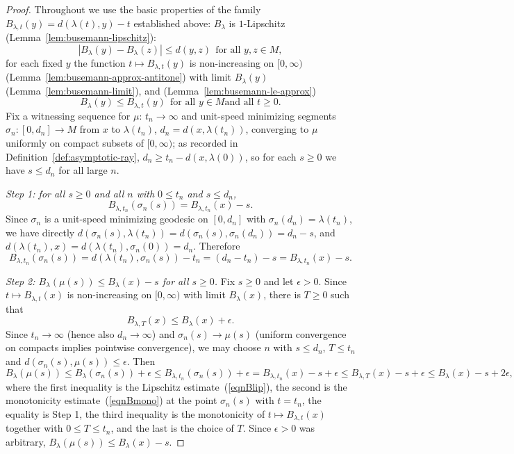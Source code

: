 \begin{proof}
\leanok
{}
Throughout we use the basic properties of the family
$B_{\lambda,t}(y)=d(\lambda(t),y)-t$ established above: $B_\lambda$
is $1$-Lipschitz (Lemma~\ref{lem:busemann-lipschitz}):
\begin{equation}\label{eqnBlip}
|B_\lambda(y)-B_\lambda(z)|\le d(y,z)\ \ \text{for all } y,z\in M,
\end{equation}
for each fixed $y$ the function $t\mapsto B_{\lambda,t}(y)$ is
non-increasing on $[0,\infty)$
(Lemma~\ref{lem:busemann-approx-antitone}) with limit
$B_\lambda(y)$ (Lemma~\ref{lem:busemann-limit}), and
(Lemma~\ref{lem:busemann-le-approx})
\begin{equation}\label{eqnBmono}
B_\lambda(y)\le B_{\lambda,t}(y)\ \ \text{for all } y\in M \text{
and all } t\ge 0.
\end{equation}
Fix a witnessing sequence for $\mu$: $t_n\rightarrow\infty$ and
unit-speed minimizing segments $\sigma_n\colon[0,d_n]\to M$ from
$x$ to $\lambda(t_n)$, $d_n=d(x,\lambda(t_n))$, converging to $\mu$
uniformly on compact subsets of $[0,\infty)$; as recorded in
Definition~\ref{def:asymptotic-ray}, $d_n\ge
t_n-d(x,\lambda(0))$, so for each $s\ge0$ we have $s\le d_n$ for
all large $n$.

{\em Step 1: for all $s\ge 0$ and all $n$ with $0\le t_n$ and
$s\le d_n$,}
$$B_{\lambda,t_n}(\sigma_n(s))=B_{\lambda,t_n}(x)-s.$$
Since $\sigma_n$ is a unit-speed minimizing geodesic on $[0,d_n]$
with $\sigma_n(d_n)=\lambda(t_n)$, we have directly
$d(\sigma_n(s),\lambda(t_n))=d(\sigma_n(s),\sigma_n(d_n))=d_n-s$,
and $d(\lambda(t_n),x)=d(\lambda(t_n),\sigma_n(0))=d_n$. Therefore
$$B_{\lambda,t_n}(\sigma_n(s))=d(\lambda(t_n),\sigma_n(s))-t_n
=(d_n-t_n)-s=B_{\lambda,t_n}(x)-s.$$

{\em Step 2: $B_\lambda(\mu(s))\le B_\lambda(x)-s$ for all $s\ge
0$.} Fix $s\ge 0$ and let $\epsilon>0$. Since $t\mapsto
B_{\lambda,t}(x)$ is non-increasing on $[0,\infty)$ with limit
$B_\lambda(x)$, there is $T\ge0$ such that
$$B_{\lambda,T}(x)\le B_\lambda(x)+\epsilon.$$
Since $t_n\rightarrow\infty$ (hence also $d_n\rightarrow\infty$)
and $\sigma_n(s)\rightarrow\mu(s)$ (uniform convergence on
compacts implies pointwise convergence), we may choose $n$ with
$s\le d_n$, $T\le t_n$ and $d(\sigma_n(s),\mu(s))\le\epsilon$.
Then
$$B_\lambda(\mu(s))\le B_\lambda(\sigma_n(s))+\epsilon\le
B_{\lambda,t_n}(\sigma_n(s))+\epsilon
=B_{\lambda,t_n}(x)-s+\epsilon\le
B_{\lambda,T}(x)-s+\epsilon\le B_\lambda(x)-s+2\epsilon,$$
where the first inequality is the Lipschitz
estimate~(\ref{eqnBlip}), the second is the monotonicity
estimate~(\ref{eqnBmono}) at the point $\sigma_n(s)$ with $t=t_n$,
the equality is Step 1, the third inequality is the monotonicity of
$t\mapsto B_{\lambda,t}(x)$ together with $0\le T\le t_n$, and the
last is the choice of $T$. Since $\epsilon>0$ was arbitrary,
$B_\lambda(\mu(s))\le B_\lambda(x)-s$.


\end{proof}
